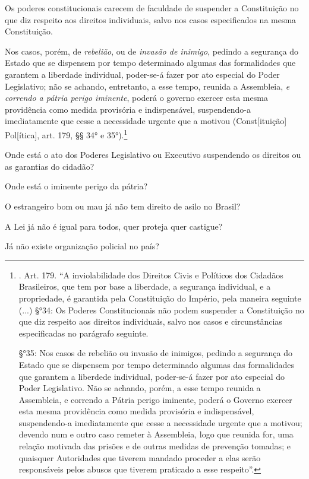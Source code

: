 Os poderes constitucionais carecem de faculdade de suspender a
Constituição no que diz respeito aos direitos individuais, salvo nos
casos especificados na mesma Constituição.

Nos casos, porém, de \emph{rebelião}, ou de \emph{invasão de inimigo},
pedindo a segurança do Estado que se dispensem por tempo determinado
algumas das formalidades que garantem a liberdade individual, poder-se-á
fazer por ato especial do Poder Legislativo; não se achando, entretanto,
a esse tempo, reunida a Assembleia, \emph{e correndo a pátria perigo
iminente}, poderá o governo exercer esta mesma providência como medida
provisória e indispensável, suspendendo-a imediatamente que cesse a
necessidade urgente que a motivou (Const{[}ituição{]} Pol{[}ítica{]},
art. 179, §§ 34° e 35°).\footnote{. Art. 179. ``A inviolabilidade dos
  Direitos Civis e Políticos dos Cidadãos Brasileiros, que tem por base
  a liberdade, a segurança individual, e a propriedade, é garantida pela
  Constituição do Império, pela maneira seguinte (...) §°34: Os Poderes
  Constitucionais não podem suspender a Constituição no que diz respeito
  aos direitos individuais, salvo nos casos e circunstâncias
  especificadas no parágrafo seguinte.

  §°35: Nos casos de rebelião ou invasão de inimigos, pedindo a
  segurança do Estado que se dispensem por tempo determinado algumas das
  formalidades que garantem a liberdede individual, poder-se-á fazer por
  ato especial do Poder Legislativo. Não se achando, porém, a esse tempo
  reunida a Assembleia, e correndo a Pátria perigo iminente, poderá o
  Governo exercer esta mesma providência como medida provisória e
  indispensável, suspendendo-a imediatamente que cesse a necessidade
  urgente que a motivou; devendo num e outro caso remeter à Assembleia,
  logo que reunida for, uma relação motivada das prisões e de outras
  medidas de prevenção tomadas; e quaisquer Autoridades que tiverem
  mandado proceder a elas serão responsáveis pelos abusos que tiverem
  praticado a esse respeito''.}

Onde está o ato dos Poderes Legislativo ou Executivo suspendendo os
direitos ou as garantias do cidadão?

Onde está o iminente perigo da pátria?

O estrangeiro bom ou mau já não tem direito de asilo no Brasil?

A Lei já não é igual para todos, quer proteja quer castigue?

Já não existe organização policial no país?

